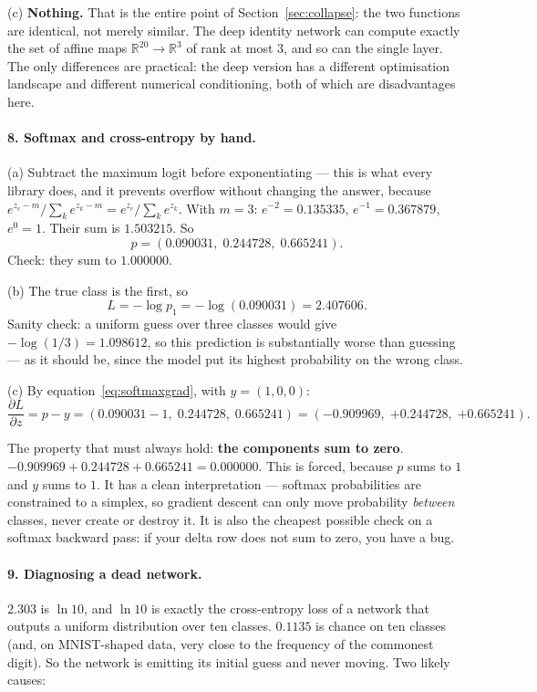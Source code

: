 \documentclass[11pt]{article}
\begin{document}
(c) \textbf{Nothing.} That is the entire point of Section~\ref{sec:collapse}:
the two functions are identical, not merely similar. The deep identity network
can compute exactly the set of affine maps $\mathbb{R}^{20} \to \mathbb{R}^3$
of rank at most $3$, and so can the single layer. The only differences are
practical: the deep version has a different optimisation landscape and
different numerical conditioning, both of which are disadvantages here.

\paragraph{8. Softmax and cross-entropy by hand.}

(a) Subtract the maximum logit before exponentiating --- this is what every
library does, and it prevents overflow without changing the answer, because
$e^{z_c - m}/\sum_k e^{z_k - m} = e^{z_c}/\sum_k e^{z_k}$. With $m = 3$:
$e^{-2} = 0.135335$, $e^{-1} = 0.367879$, $e^{0} = 1$. Their sum is
$1.503215$. So
\[
  p = (0.090031,\; 0.244728,\; 0.665241).
\]
Check: they sum to $1.000000$.

(b) The true class is the first, so
\[
  L = -\log p_1 = -\log(0.090031) = \mathbf{2.407606}.
\]
Sanity check: a uniform guess over three classes would give
$-\log(1/3) = 1.098612$, so this prediction is substantially worse than
guessing --- as it should be, since the model put its highest probability on
the wrong class.

(c) By equation~\eqref{eq:softmaxgrad}, with $y = (1, 0, 0)$:
\[
  \frac{\partial L}{\partial z} = p - y
  = (0.090031 - 1,\; 0.244728,\; 0.665241)
  = (\mathbf{-0.909969},\; \mathbf{+0.244728},\; \mathbf{+0.665241}).
\]

The property that must always hold: \textbf{the components sum to zero}.
$-0.909969 + 0.244728 + 0.665241 = 0.000000$. This is forced, because $p$ sums
to $1$ and $y$ sums to $1$. It has a clean interpretation --- softmax
probabilities are constrained to a simplex, so gradient descent can only move
probability \emph{between} classes, never create or destroy it. It is also the
cheapest possible check on a softmax backward pass: if your delta row does not
sum to zero, you have a bug.

\paragraph{9. Diagnosing a dead network.}

$2.303$ is $\ln 10$, and $\ln 10$ is exactly the cross-entropy loss of a
network that outputs a uniform distribution over ten classes. $0.1135$ is
chance on ten classes (and, on MNIST-shaped data, very close to the frequency
of the commonest digit). So the network is emitting its initial guess and
never moving. Two likely causes:
\end{document}
